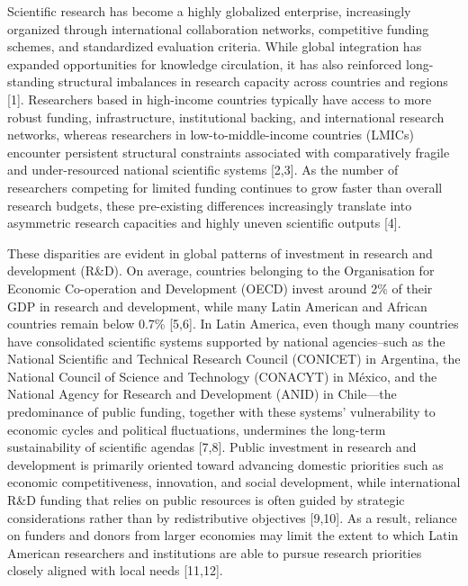 \documentclass[
  letterpaper,
  DIV=11,
  numbers=noendperiod]{scrartcl}
\begin{document}
Scientific research has become a highly globalized enterprise,
increasingly organized through international collaboration networks,
competitive funding schemes, and standardized evaluation criteria. While
global integration has expanded opportunities for knowledge circulation,
it has also reinforced long-standing structural imbalances in research
capacity across countries and regions {[}1{]}. Researchers based in
high-income countries typically have access to more robust funding,
infrastructure, institutional backing, and international research
networks, whereas researchers in low-to-middle-income countries (LMICs)
encounter persistent structural constraints associated with
comparatively fragile and under-resourced national scientific systems
{[}2,3{]}. As the number of researchers competing for limited funding
continues to grow faster than overall research budgets, these
pre-existing differences increasingly translate into asymmetric research
capacities and highly uneven scientific outputs {[}4{]}.

These disparities are evident in global patterns of investment in
research and development (R\&D). On average, countries belonging to the
Organisation for Economic Co-operation and Development (OECD) invest
around 2\% of their GDP in research and development, while many Latin
American and African countries remain below 0.7\% {[}5,6{]}. In Latin
America, even though many countries have consolidated scientific systems
supported by national agencies--such as the National Scientific and
Technical Research Council (CONICET) in Argentina, the National Council
of Science and Technology (CONACYT) in México, and the National Agency
for Research and Development (ANID) in Chile---the predominance of
public funding, together with these systems' vulnerability to economic
cycles and political fluctuations, undermines the long-term
sustainability of scientific agendas {[}7,8{]}. Public investment in
research and development is primarily oriented toward advancing domestic
priorities such as economic competitiveness, innovation, and social
development, while international R\&D funding that relies on public
resources is often guided by strategic considerations rather than by
redistributive objectives {[}9,10{]}. As a result, reliance on funders
and donors from larger economies may limit the extent to which Latin
American researchers and institutions are able to pursue research
priorities closely aligned with local needs {[}11,12{]}.
\end{document}
